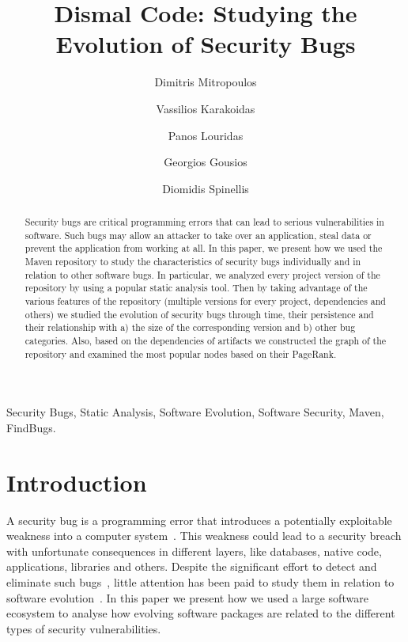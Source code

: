 \documentclass[conference]{llncs}
\begin{document}
\title{Dismal Code: Studying the Evolution of Security Bugs}

\author{Dimitris Mitropoulos \and Vassilios Karakoidas \and Panos Louridas \and Georgios Gousios \and Diomidis Spinellis }

\maketitle

\begin{abstract}
Security bugs are critical programming errors that can lead to serious
vulnerabilities in software. Such bugs may allow an attacker to take over
an application, steal data or prevent the application from working at all.
In this paper, we present how we used the Maven repository to study the
characteristics of security bugs individually and in relation to other software
bugs. In particular, we analyzed every project version of the repository by using a
popular static analysis tool. Then by taking advantage of the various features of
the repository (multiple versions for every project, dependencies and others) we studied
the evolution of security bugs through time, their persistence and their relationship with a) the
size of the corresponding version and b) other bug categories. Also, based on the
dependencies of artifacts we constructed the graph of the repository and
examined the most popular nodes based on their PageRank. 
\end{abstract}

\begin{keywords}
Security Bugs, Static Analysis, Software Evolution, Software
Security, Maven, FindBugs.
\end{keywords}

\section{Introduction}

A security bug is a programming error that introduces a potentially
exploitable weakness into a computer system~\cite{SSL12}\cite{TJBD11}\cite{M06}. This weakness could lead to a
security breach with unfortunate consequences in different layers, like databases,
native code, applications, libraries and others. Despite the significant
effort to detect and eliminate such bugs~\cite{SZ12}, little attention has been paid to
study them in relation to software evolution~\cite{L96}\cite{LRWPT97}\cite{IB06}\cite{RGMA06}.
In this paper we present how we used a large software ecosystem to analyse
how evolving software packages are related to the different types of security
vulnerabilities.
\end{document}
